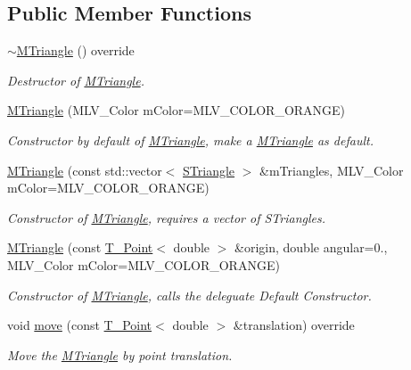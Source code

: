 \subsection*{Public Member Functions}
\begin{DoxyCompactItemize}
\item 
\mbox{\label{classMTriangle_aad494b73728c03ca00e728b0c505a88f}} 
\hyperlink{classMTriangle_aad494b73728c03ca00e728b0c505a88f}{$\sim$\+M\+Triangle} () override
\begin{DoxyCompactList}\small\item\em Destructor of \hyperlink{classMTriangle}{M\+Triangle}. \end{DoxyCompactList}\item 
\hyperlink{classMTriangle_aa3d177f785a15aee1416d5b0382b2f23}{M\+Triangle} (M\+L\+V\+\_\+\+Color mColor=M\+L\+V\+\_\+\+C\+O\+L\+O\+R\+\_\+\+O\+R\+A\+N\+GE)
\begin{DoxyCompactList}\small\item\em Constructor by default of \hyperlink{classMTriangle}{M\+Triangle}, make a \hyperlink{classMTriangle}{M\+Triangle} as default. \end{DoxyCompactList}\item 
\hyperlink{classMTriangle_ab611bdde6afe8f0ab0b3308d36b2416c}{M\+Triangle} (const std\+::vector$<$ \hyperlink{classSTriangle}{S\+Triangle} $>$ \&mTriangles, M\+L\+V\+\_\+\+Color mColor=M\+L\+V\+\_\+\+C\+O\+L\+O\+R\+\_\+\+O\+R\+A\+N\+GE)
\begin{DoxyCompactList}\small\item\em Constructor of \hyperlink{classMTriangle}{M\+Triangle}, requires a vector of S\+Triangles. \end{DoxyCompactList}\item 
\hyperlink{classMTriangle_a3c0ffb582fd22a3a673ec13e6575da28}{M\+Triangle} (const \hyperlink{classPoint}{T_Point}$<$ double $>$ \&origin, double angular=0., M\+L\+V\+\_\+\+Color mColor=M\+L\+V\+\_\+\+C\+O\+L\+O\+R\+\_\+\+O\+R\+A\+N\+GE)
\begin{DoxyCompactList}\small\item\em Constructor of \hyperlink{classMTriangle}{M\+Triangle}, calls the deleguate Default Constructor. \end{DoxyCompactList}\item 
void \hyperlink{classMTriangle_aa21f0514a8af2beba5ecf2ea5a22a4ef}{move} (const \hyperlink{classPoint}{T_Point}$<$ double $>$ \&translation) override
\begin{DoxyCompactList}\small\item\em Move the \hyperlink{classMTriangle}{M\+Triangle} by point translation. \end{DoxyCompactList}\item 

\end{DoxyCompactItemize}
